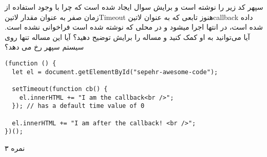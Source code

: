 \documentclass[../main.tex]{subfiles}
\begin{document}

سپهر کد زیر را نوشته است و برایش سوال ایجاد شده است که چرا با وجود استفاده از زمان صفر به عنوان مقدار ‌لاتین{Timeout}
هنوز تابعی که به عنوان ‌لاتین{callback} داده شده است، در انتها اجرا میشود و در محلی که نوشته شده است فراخوانی نشده است. آیا می‌توانید به او کمک کنید و مساله را برایش توضیح دهید؟
آیا این مساله تنها روی سیستم سپهر رخ می دهد؟

\begin{latin}
\begin{verbatim}
(function () {
  let el = document.getElementById("sepehr-awesome-code");

  setTimeout(function cb() {
    el.innerHTML += "I am the callback<br />";
  }); // has a default time value of 0

  el.innerHTML += "I am after the callback! <br />";
})();
\end{verbatim}
\end{latin}

۳ نمره
\end{document}
